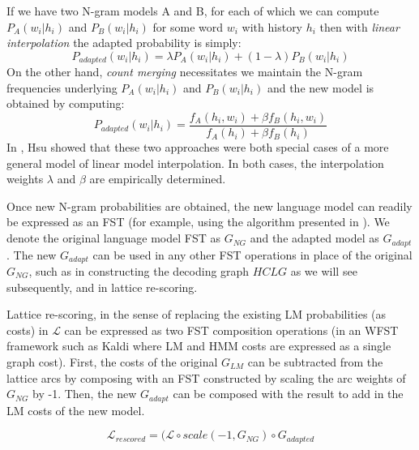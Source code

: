 If we have two N-gram models A and B, for each of which we can compute $P_A(w_i|h_i)$ and $P_B(w_i|h_i)$ for some word $w_i$ with history $h_i$ then with \textit{linear interpolation} the adapted probability is simply:
\begin{equation}
P_{adapted}(w_i|h_i) =  \lambda P_A(w_i|h_i) + (1-\lambda) P_B(w_i|h_i) \label{eqn4:linear}
\end{equation}
\noindent On the other hand, \textit{count merging} necessitates we maintain the N-gram frequencies underlying $P_A(w_i|h_i)$ and $P_B(w_i|h_i)$ and the new model is obtained by computing:
\begin{equation}
P_{adapted}(w_i|h_i) =  \frac{f_A(h_i,w_i) + \beta f_B(h_i,w_i)} 
{f_A(h_i) + \beta f_B(h_i)} \label{eqn:countmerge}
\end{equation}
In \cite{hsu2007gen}, Hsu showed that these two approaches were both special cases of a more general model of linear model interpolation.  In both cases, the interpolation weights $\lambda$ and $\beta$ are empirically determined.

Once new N-gram probabilities are obtained, the new language model can readily be expressed as an FST (for example, using the algorithm presented in \cite{allauzen2003lm}).  We denote the original language model FST as $G_{NG}$ and the adapted model as $G_{adapt}$.  The new $G_{adapt}$ can be used in any other FST operations in place of the original $G_{NG}$, such as in constructing the decoding graph $HCLG$ as we will see subsequently, and in lattice re-scoring.

Lattice re-scoring, in the sense of replacing the existing LM probabilities (as costs) in $\mathcal{L}$ can be expressed as two FST composition operations (in an WFST framework such as Kaldi where LM and HMM costs are expressed as a single graph cost).   First, the costs of the original $G_{LM}$ can be subtracted from the lattice arcs by composing with an FST constructed by scaling the arc weights of $G_{NG}$ by -1.  Then, the new $G_{adapt}$ can be composed with the result to add in the LM costs of the new model.

\begin{equation}
\mathcal{L}_{rescored} = (\mathcal{L} \circ scale(-1, G_{NG}) \circ G_{adapted} \label{eqn:latrescore1}
\end{equation}

